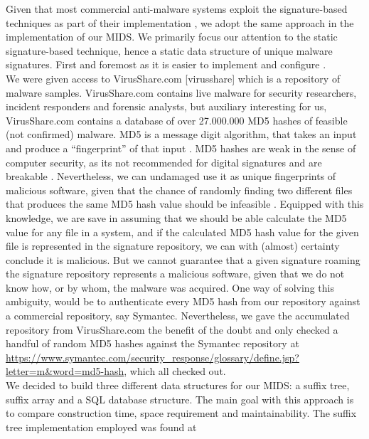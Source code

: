 \documentclass[12pt]{article} %
\begin{document}
Given that most commercial anti-malware systems exploit the signature-based techniques as part of their implementation \cite{kruegel2003using}, we adopt the same approach in the implementation of our MIDS. We primarily focus our attention to the static signature-based technique, hence a static data structure of unique malware signatures. First and foremost as it is easier to implement and configure \cite{kruegel2003using}.  \\
We were given access to VirusShare.com  [virusshare] which is a repository of malware samples.  VirusShare.com contains live malware for security researchers, incident responders and forensic analysts, but auxiliary interesting for us, VirusShare.com contains a database of over 27.000.000 MD5 hashes of feasible (not confirmed) malware. MD5 is a message digit algorithm, that takes an input and produce a “fingerprint” of that input \cite{turner2011updated}. MD5 hashes are weak in the sense of computer security, as its not recommended for digital signatures \cite{turner2011updated } and are breakable  \cite{turner2011updated, wang2005break}. Nevertheless, we can undamaged use it as unique fingerprints of malicious software, given that the chance of randomly finding two different files that produces the same MD5 hash value should be infeasible \cite{thompson2005md5}. Equipped with this knowledge, we are save in assuming that we should be able calculate the MD5 value for any file in a system,  and if the calculated MD5 hash value for the given file is represented in the signature repository, we can with (almost) certainty conclude it is malicious. But we cannot guarantee that a given signature roaming the signature repository represents a malicious software, given that we do not know how, or by whom, the malware was acquired. One way of solving this ambiguity, would be to authenticate every MD5 hash from our repository against a commercial repository, say Symantec. Nevertheless, we gave the accumulated repository from VirusShare.com  the benefit of the doubt and only checked a handful of random MD5 hashes against the Symantec repository at \href{https://www.symantec.com/security_response/glossary/define.jsp?letter=m&word=md5-hash}{https://www.symantec.com/security_response/glossary/define.jsp?letter=m&word=md5-hash}, which all checked out. \\
We decided to build three different data structures for our MIDS: a suffix tree, suffix array and a SQL database structure. The main goal with this approach is to compare construction time, space requirement and maintainability. The suffix tree implementation employed was found at \href{https://github.com/atillabyte/SuffixTree/tree/master/src/SuffixTree}\\
\end{document}
